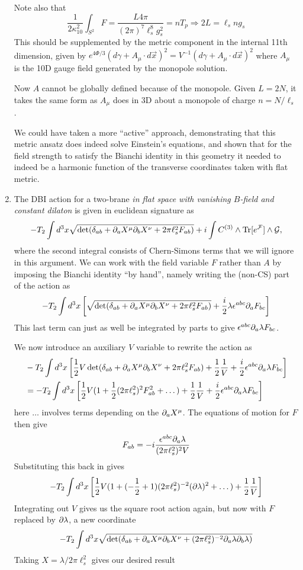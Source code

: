 \documentclass[11pt, class=article, crop=false]{standalone}
\begin{document}
\begin{enumerate}
	Note also that
	\[
		\frac{1}{2 \kappa_{10}^2} \int_{S^2} F = \frac{L 4 \pi}{(2\pi)^7 \ell_s^8 g_s^2} = n T_p \Rightarrow 2 L = \ell_s n g_s
	\]
	This should be supplemented by the metric component in the internal 11th dimension, given by $e^{4 \Phi/3} (d\gamma + A_\mu \cdot d \vec x)^2 = V^{-1} (d\gamma + A_\mu \cdot d \vec x)^2$ where $A_\mu$ is the 10D gauge field generated by the monopole solution. 
	
	Now $A$ cannot be globally defined because of the monopole. Given $L = 2N$, it takes the same form as $A_\mu$ does in 3D about a monopole of charge $n = N/\ell_s$.
	
	We could have taken a more ``active'' approach, demonstrating that this metric ansatz does indeed solve Einstein's equations, and shown that for the field strength to satisfy the Bianchi identity in this geometry it needed to indeed be a harmonic function of the transverse coordinates taken with flat metric. 
	
	\item The DBI action for a two-brane \emph{in flat space with vanishing $B$-field and constant dilaton} is given in euclidean signature as
	\[
		- T_2 \int d^3 x \sqrt{\det (\delta_{ab} + \partial_a X^\mu \partial_b X^\nu + 2 \pi \ell_s^2 F_{ab})} + i \int C^{(3)} \wedge \mathrm{Tr}[e^{\mathcal F}] \wedge \mathcal G,
	\]
	where the second integral consists of Chern-Simons terms that we will ignore in this argument. We can work with the field variable $F$ rather than $A$ by imposing the Bianchi identity ``by hand'', namely writing the (non-CS) part of the action as
	\[
		-T_2 \int d^3 x \left[ \sqrt{\det (\delta_{ab} + \partial_a X^\mu \partial_b X^\nu + 2 \pi \ell_s^2 F_{ab})} + \frac{i}{2} \lambda \epsilon^{abc} \partial_a F_{b c} \right]
	\]
	This last term can just as well be integrated by parts to give $\epsilon^{abc} \partial_a \lambda F_{bc}$.
	
	We now introduce an auxiliary $V$ variable to rewrite the action as
	\[
	\begin{aligned}
		&-T_2 \int d^3 x \left[\frac12 V \det(\delta_{ab} + \partial_a X^\mu \partial_b X^\nu + 2 \pi \ell_s^2 F_{ab})  + \frac12 \frac1V + \frac{i}{2}\epsilon^{abc} \partial_a \lambda F_{bc} \right]\\
		& = -T_2 \int d^3 x \left[\frac12 V (1 + \frac12 (2\pi \ell_s^2)^2 F_{ab}^2  + \dots ) + \frac12 \frac{1}{V} + \frac{i}{2}\epsilon^{abc} \partial_a \lambda F_{bc} \right]
	\end{aligned}
	\]
	here $\dots$ involves terms depending on the $\partial_a X^\mu$.
	The equations of motion for $F$ then give 
	\[
		F_{ab} = - i \frac{\epsilon^{abc} \partial_a \lambda}{(2 \pi \ell_s^2)^2 V}
	\]
	Substituting this back in gives
	\[
		 -T_2 \int d^3 x  \left[ \frac12 V (1 + (- \frac12 + 1) (2 \pi \ell_s^2)^{-2} (\partial \lambda)^2 + \dots ) + \frac12 \frac{1}{V} \right]
	\]
	Integrating out $V$ gives us the square root action again, but now with $F$ replaced by $\partial \lambda$, a new coordinate 
	\[
		- T_2 \int d^3 x \sqrt{\det (\delta_{ab} +\partial_a X^\mu \partial_b X^\nu +  (2 \pi \ell_s^2)^{-2}  \partial_a \lambda \partial_b \lambda )}
	\]
	Taking $X = \lambda / 2\pi \ell_s^2$ gives our desired result
	

\end{enumerate}
\end{document}
